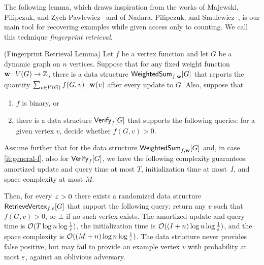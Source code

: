 The following lemma, which draws inspiration from the works of Majewski, Pilipczuk, and Zych-Pawlewicz~\cite{Majewski24} and of Nadara, Pilipczuk, and Smulewicz~\cite{Nadara22}, is our main tool for recovering examples while given access only to counting. We call this technique \emph{fingerprint retrieval}.
\begin{lemma}(Fingerprint Retrieval Lemma) \label{lem:restore-by-sampling}
	Let $f$ be a vertex function and let $G$ be a dynamic graph on $n$ vertices.
	Suppose that for any fixed weight function $\mathbf{w} \colon V(G) \to \mathbb{Z}$, there is a data structure $\mathsf{WeightedSum}_{f, \mathbf{w}}[G]$ that reports the quantity $\sum_{v \in V(G)} f(G, v)\cdot \mathbf{w}(v)$ after every update to $G$.
	Also, suppose that
	\begin{enumerate}[label={(\arabic*)}]
		\item \label{it:binary-f} $f$ is binary, or
		\item \label{it:general-f} there is a data structure $\mathsf{Verify}_{f}[G]$ that supports the following queries: for a given vertex $v$, decide whether $f(G, v)>0$.
	\end{enumerate}
	Assume further that for the data structure $\mathsf{WeightedSum}_{f, \mathbf{w}}[G]$ and, in case \ref{it:general-f}, also for $\mathsf{Verify}_f[G]$, we have the following complexity guarantees: amortized update and query time at most $T$, initialization time at most~$I$, and space complexity at most $M$.

	Then, for every~$\varepsilon>0$ there exists a randomized data structure $\mathsf{RetrieveVertex}_{f,\varepsilon}[G]$ that support the following query: return any $v$ such that $f(G, v) > 0$, or $\bot$ if no such vertex exists. The amortized update and query time is $\mathcal{O}(T\log n\log \tfrac{1}{\varepsilon})$, the initialization time is $\mathcal{O}((I+n)\log n\log \tfrac{1}{\varepsilon})$, and the space complexity is $\mathcal{O}((M+n)\log n\log \tfrac{1}{\varepsilon})$. The data structure never provides false positive, but may fail to provide an example vertex $v$ with probability at most $\varepsilon$, against an oblivious adversary.
\end{lemma}	
	
	
	

